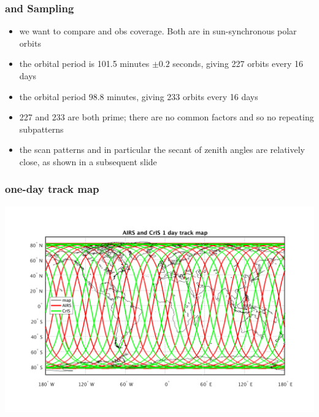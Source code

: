 \begin{frame}
\frametitle{{\airs} and {\cris} Sampling}

\begin{itemize}

  \item we want to compare {\airs} and {\cris} obs coverage.  Both
    are in sun-synchronous polar orbits

  \item the {\cris} orbital period is 101.5 minutes $\pm 0.2$
    seconds, giving 227 orbits every 16 days

  \item the {\airs} orbital period 98.8 minutes, giving 233 orbits
    every 16 days

  \item 227 and 233 are both prime; there are no common factors and
    so no repeating subpatterns

  \item the scan patterns and in particular the secant of zenith
    angles are relatively close, as shown in a subsequent slide

\end{itemize}
\end{frame}
\begin{frame}
\frametitle{one-day track map}
\begin{center}
  \includegraphics[scale=0.5]{figures/subpt_1_day_all.png}
\end{center}
\end{frame} %
